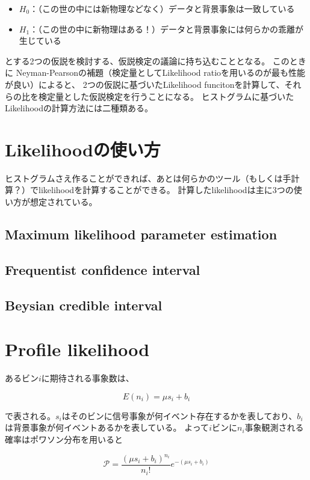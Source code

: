 \documentclass[a4paper,uplatex]{jsreport}
\begin{document}
\begin{euation}
\begin{euation}
\begin{euation}
\begin{euation}
\begin{itemize}
  \item $H_0$：（この世の中には新物理などなく）データと背景事象は一致している
  \item $H_1$：（この世の中に新物理はある！）データと背景事象には何らかの乖離が生じている
\end{itemize}

とする2つの仮説を検討する、仮説検定の議論に持ち込むこととなる。
このときに Neyman-Pearsonの補題（検定量としてLikelihood ratioを用いるのが最も性能が良い）によると、
2つの仮説に基づいたLikelihood funcitonを計算して、それらの比を検定量とした仮説検定を行うことになる。
ヒストグラムに基づいたLikelihoodの計算方法には二種類ある。


\section{Likelihoodの使い方}

ヒストグラムさえ作ることができれば、あとは何らかのツール（もしくは手計算？）でlikelihoodを計算することができる。
計算したlikelihoodは主に3つの使い方が想定されている。

\subsection{Maximum likelihood parameter estimation}
\subsection{Frequentist confidence interval}
\subsection{Beysian credible interval}

\section{Profile likelihood}

あるビン$i$に期待される事象数は、

\begin{equation}
E(n_i) = \mu s_i + b_i
\end{equation}

で表される。$s_i$はそのビンに信号事象が何イベント存在するかを表しており、$b_i$は背景事象が何イベントあるかを表している。
よって$i$ビンに$n_i$事象観測される確率はポワソン分布を用いると

\begin{equation}
\mathcal{P} = \frac{(\mu s_i+b_i)^{n_i}}{n_i!}e^{-(\mu s_i+b_i)}
\end{equation}


\end{euation}
\end{euation}
\end{euation}
\end{euation}
\end{document}
